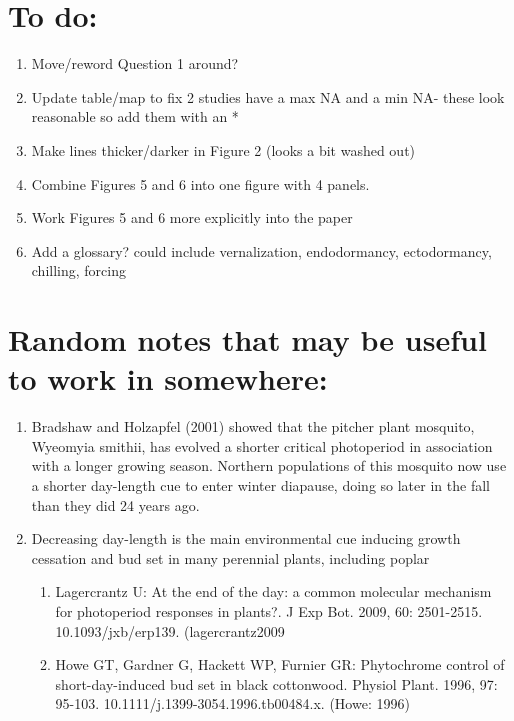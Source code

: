 \documentclass{article}
\begin{document}
\section* {To do:}
\begin{enumerate}
\item Move/reword Question 1 around?
\item Update table/map to fix 2 studies have a max NA and a min NA- these look reasonable so add them with an *
\item Make lines thicker/darker in Figure 2 (looks a bit washed out)
\item Combine Figures 5 and 6 into one figure with 4 panels. 
\item Work Figures 5 and 6 more explicitly into the paper
\item Add a glossary? could include vernalization, endodormancy, ectodormancy, chilling, forcing
\end{enumerate}
\section* {Random notes that may be useful to work in somewhere:}
\begin {enumerate}
\item Bradshaw and Holzapfel (2001) showed that the pitcher plant mosquito,
Wyeomyia smithii, has evolved a shorter critical photoperiod in association with a
longer growing season. Northern populations of this mosquito now use a shorter
day-length cue to enter winter diapause, doing so later in the fall than they did
24 years ago.
\item Decreasing day-length is the main environmental cue inducing growth cessation and bud set in many perennial plants, including poplar 
\begin{enumerate}

\item Lagercrantz U: At the end of the day: a common molecular mechanism for photoperiod responses in plants?. J Exp Bot. 2009, 60: 2501-2515. 10.1093/jxb/erp139. (lagercrantz2009
\item Howe GT, Gardner G, Hackett WP, Furnier GR: Phytochrome control of short-day-induced bud set in black cottonwood. Physiol Plant. 1996, 97: 95-103. 10.1111/j.1399-3054.1996.tb00484.x. (Howe: 1996)
\end{enumerate}


\end {enumerate}

\clearpage
\end{document}

